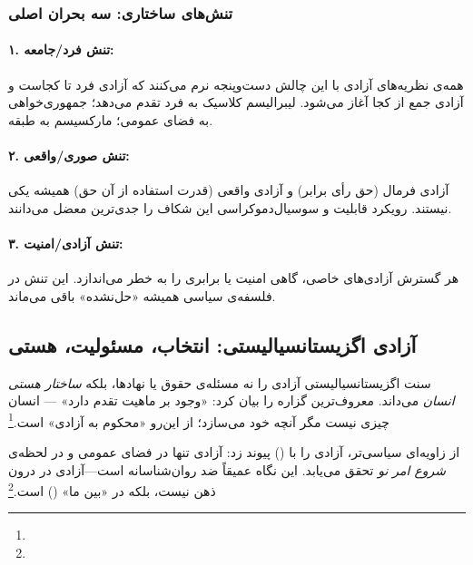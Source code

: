 \subsubsection{تنش‌های ساختاری: سه بحران اصلی}

\paragraph{۱. تنش فرد/جامعه:}
همه‌ی نظریه‌های آزادی با این چالش دست‌وپنجه نرم می‌کنند که آزادی فرد تا کجاست و آزادی جمع از کجا آغاز می‌شود. لیبرالیسم کلاسیک به فرد تقدم می‌دهد؛ جمهوری‌خواهی به فضای عمومی؛ مارکسیسم به طبقه.

\paragraph{۲. تنش صوری/واقعی:}
آزادی فرمال (حق رأی برابر) و آزادی واقعی (قدرت استفاده از آن حق) همیشه یکی نیستند. رویکرد قابلیت و سوسیال‌دموکراسی این شکاف را جدی‌ترین معضل می‌دانند.

\paragraph{۳. تنش آزادی/امنیت:}
هر گسترش آزادی‌های خاصی، گاهی امنیت یا برابری را به خطر می‌اندازد. این تنش در فلسفه‌ی سیاسی همیشه «حل‌نشده» باقی می‌ماند.

\subsection{آزادی اگزیستانسیالیستی: انتخاب، مسئولیت، هستی}
\label{subsec:exist}

سنت اگزیستانسیالیستی آزادی را نه مسئله‌ی حقوق یا نهادها، بلکه \textit{ساختار هستی انسان} می‌داند.  معروف‌ترین گزاره را بیان کرد: «وجود بر ماهیت تقدم دارد» — انسان چیزی نیست مگر آنچه خود می‌سازد؛ از این‌رو «محکوم به آزادی» است.\footnote{} %

 از زاویه‌ای سیاسی‌تر، آزادی را با  () پیوند زد: آزادی تنها در فضای عمومی و در لحظه‌ی \textit{شروع امر نو} تحقق می‌یابد. این نگاه عمیقاً ضد روان‌شناسانه است—آزادی در درون ذهن نیست، بلکه در «بین ما» () است.\footnote{} %

